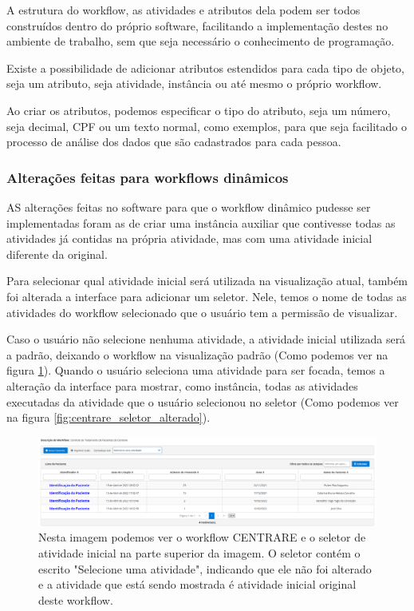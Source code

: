 A estrutura do workflow, as atividades e atributos dela podem ser todos construídos dentro do próprio software, facilitando a implementação destes no ambiente de trabalho, sem que seja necessário o conhecimento de programação.

Existe a possibilidade de adicionar atributos estendidos para cada tipo de objeto, seja um atributo, seja atividade, instância ou até mesmo o próprio workflow.

Ao criar os atributos, podemos especificar o tipo do atributo, seja um número, seja decimal, CPF ou um texto normal, como exemplos, para que seja facilitado o processo de análise dos dados que são cadastrados para cada pessoa.

 \subsubsection{Alterações feitas para workflows dinâmicos}

AS alterações feitas no software para que o workflow dinâmico pudesse ser implementadas foram as de criar uma instância auxiliar que contivesse todas as atividades já contidas na própria atividade, mas com uma atividade inicial diferente da original.

Para selecionar qual atividade inicial será utilizada na visualização atual, também foi alterada a interface para adicionar um seletor. Nele, temos o nome de todas as atividades do workflow selecionado que o usuário tem a permissão de visualizar.

Caso o usuário não selecione nenhuma atividade, a atividade inicial utilizada será a padrão, deixando o workflow na visualização padrão (Como podemos ver na figura \ref{fig:centrare_seletor_normal}). Quando o usuário seleciona uma atividade para ser focada, temos a alteração da interface para mostrar, como instância, todas as atividades executadas da atividade que o usuário selecionou no seletor (Como podemos ver na figura \ref{fig:centrare_seletor_alterado}).

\begin{figure}
    \centering
    \includegraphics[width=1\textwidth]{imgs/CENTRARE/instanciaNormal.png}
    \caption{Nesta imagem podemos ver o workflow CENTRARE e o seletor de atividade inicial na parte superior da imagem. O seletor contém o escrito "Selecione uma atividade", indicando que ele não foi alterado e a atividade que está sendo mostrada é atividade inicial original deste workflow.}
    \label{fig:centrare_seletor_normal}
\end{figure}

